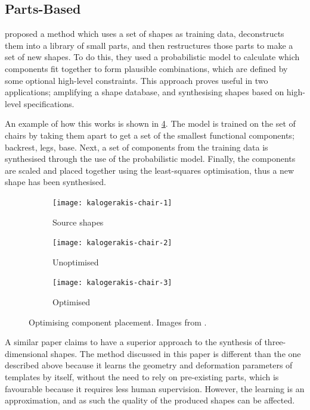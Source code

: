 \subsection{Parts-Based}\label{subsec:partsbasedmodelling}

\citet{2012probabilisticmodel} proposed a method which uses a set of shapes as training data, deconstructs them into a library of small parts, and then restructures those parts to make a set of new shapes. To do this, they used a probabilistic model to calculate which components fit together to form plausible combinations, which are defined by some optional high-level constraints. This approach proves useful in two applications; amplifying a shape database, and synthesising shapes based on high-level specifications.

An example of how this works is shown in \cref{fig:kchairs}. The model is trained on the set of chairs by taking them apart to get a set of the smallest functional components; backrest, legs, base. Next, a set of components from the training data is synthesised through the use of the probabilistic model. Finally, the components are scaled and placed together using the least-squares optimisation, thus a new shape has been synthesised.

\begin{figure}[t]
\centering
\begin{subfigure}{.3\textwidth}
  \centering
  \texttt{[image: kalogerakis-chair-1]}
  \caption{Source shapes}
  \label{fig:kchair1}
\end{subfigure}
\begin{subfigure}{.3\textwidth}
  \centering
  \texttt{[image: kalogerakis-chair-2]}
  \caption{Unoptimised}
  \label{fig:kchair2}
\end{subfigure}
\begin{subfigure}{.3\textwidth}
  \centering
  \texttt{[image: kalogerakis-chair-3]}
  \caption{Optimised}
  \label{fig:kchair3}
\end{subfigure}
\caption{Optimising component placement. Images from \protect\citet{2012probabilisticmodel}.}
\label{fig:kchairs}
\end{figure}

A similar paper \citep{2015analysisandsynthesis} claims to have a superior approach to the synthesis of three-dimensional shapes. The method discussed in this paper is different than the one described above because it learns the geometry and deformation parameters of templates by itself, without the need to rely on pre-existing parts, which is favourable because it requires less human supervision. However, the learning is an approximation, and as such the quality of the produced shapes can be affected.

